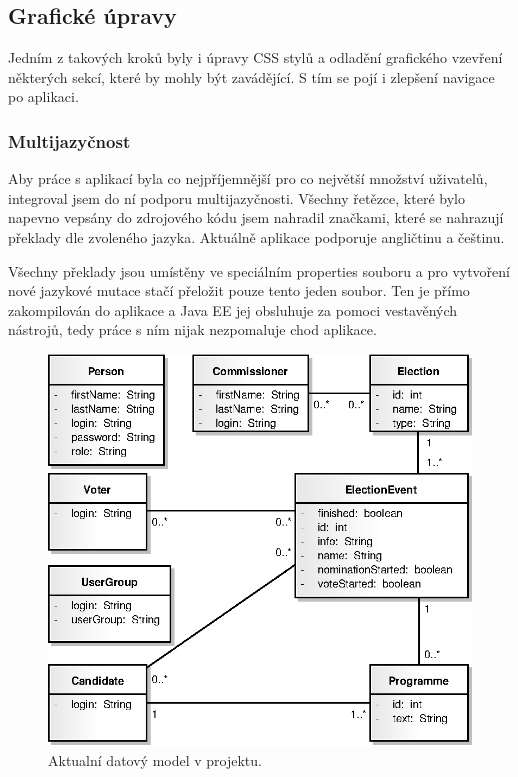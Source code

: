 \documentclass[11pt,twoside,a4paper]{book}
\begin{document}
\subsection{Grafické úpravy}

Jedním z takových kroků byly i úpravy CSS stylů a odladění grafického vzevření některých sekcí, které by mohly být zavádějící. S tím se pojí i zlepšení navigace po aplikaci.

\subsubsection{Multijazyčnost}

Aby práce s aplikací byla co nejpříjemnější pro co největší množství uživatelů, integroval jsem do ní podporu multijazyčnosti. Všechny řetězce, které bylo napevno vepsány do zdrojového kódu jsem nahradil značkami, které se nahrazují překlady dle zvoleného jazyka. Aktuálně aplikace podporuje angličtinu a češtinu. 

Všechny překlady jsou umístěny ve speciálním properties souboru a pro vytvoření nové jazykové mutace stačí přeložit pouze tento jeden soubor. Ten je přímo zakompilován do aplikace a Java EE jej obsluhuje za pomoci vestavěných nástrojů, tedy práce s ním nijak nezpomaluje chod aplikace.

\begin{figure}[!h]
	\centering
	\includegraphics[scale=0.9]{diagrams/tridy.eps}
	\caption{Aktualní datový model v projektu.}
	\label{fig:tridy}
\end{figure}
\end{document}
